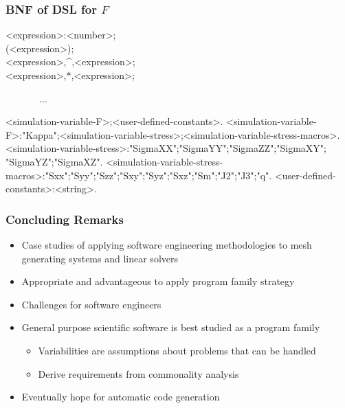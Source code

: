 \documentclass[t,12pt,numbers,fleqn]{beamer}
\begin{document}
\begin{frame}[fragile]

\frametitle{BNF of DSL for $F$}

\begin{grammar}
<expression>:<number>;\\
(<expression>);\\
<expression>,\^{ },<expression>;\\
<expression>,$*$,<expression>;\\
\end{grammar}
~~~~~~~...
\begin{grammar}
<simulation-variable-F>;<user-defined-constants>.
<simulation-variable-F>:"Kappa";<simulation-variable-stress>;<simulation-variable-stress-macros>.
<simulation-variable-stress>:"SigmaXX";"SigmaYY";"SigmaZZ";"SigmaXY";\\
"SigmaYZ";"SigmaXZ".
<simulation-variable-stress-macros>:"Sxx";"Syy";"Szz";"Sxy";"Syz";"Sxz";"Sm";"J2";"J3";"q".
<user-defined-constants>:<string>.
\end{grammar}

\end{frame}


\begin{frame}
\frametitle{Concluding Remarks}
\begin{itemize}
\item Case studies of applying software engineering methodologies to mesh generating systems and linear solvers
\item Appropriate and advantageous to apply program family strategy
\item Challenges for software engineers
\item General purpose scientific software is best studied as a program family
\begin{itemize}
\item Variabilities are assumptions about problems that can be handled
\item Derive requirements from commonality analysis
\end{itemize}
\item Eventually hope for automatic code generation
\end{itemize}
\end{frame}
\end{document}
